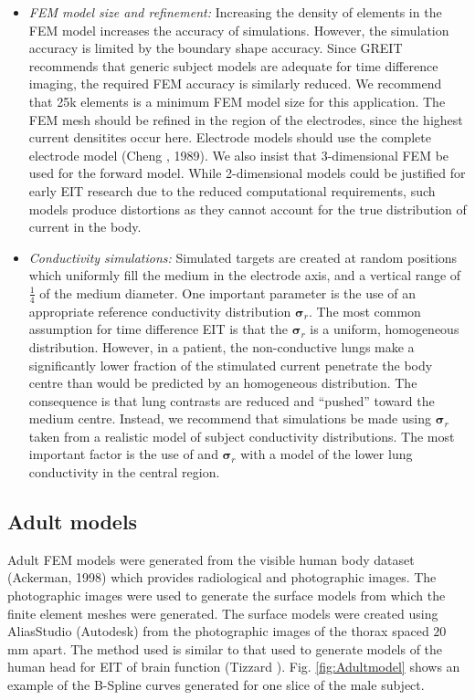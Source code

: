 \documentclass[12pt]{iopart}
\newcommand{\sG}{\mbox{${\boldsymbol \sigma}$}}
\begin{document}
\begin{itemize}
\item 
{\em FEM model size and refinement:}
Increasing the density of elements in the FEM
model increases the accuracy of simulations. However,
the simulation accuracy is limited by the boundary
shape accuracy. Since GREIT recommends that 
generic subject models are adequate for time difference
imaging, the required FEM accuracy is similarly reduced.
We recommend that 25k elements is a minimum FEM model
size for this application.
The FEM mesh should be refined in the region of
the electrodes, since the highest current densitites
occur here. Electrode models should use the
complete electrode model (Cheng \etal, 1989).
We also insist that 3-dimensional FEM be used for the
forward model. While 2-dimensional models could be
justified for early EIT research due to the reduced
computational requirements, such models produce
distortions as they cannot account for the true
distribution of current in the body.

\item
{\em Conductivity simulations:}
Simulated targets are created at random positions
which uniformly fill the medium in the electrode axis, and
a vertical range of $\frac{1}{4}$ of the medium
diameter.  One important parameter is the use of
an appropriate reference conductivity distribution
$\sG_r$. The most common assumption for time 
difference EIT is that the $\sG_r$ is a uniform,
homogeneous distribution. However, in a patient,
the non-conductive lungs make a significantly
lower fraction of the stimulated current penetrate
the body centre than would be predicted by an
homogeneous distribution. The consequence is that
lung contrasts are reduced and ``pushed'' toward
the medium centre. Instead, we recommend that 
simulations be made using $\sG_r$ taken from a
realistic model of subject conductivity distributions.
The most important factor is the use of and $\sG_r$
with a model of the lower lung conductivity in 
the central region.

\end{itemize}



\subsection{Adult models}

Adult FEM models were generated from the visible human body dataset
(Ackerman, 1998) which provides radiological and photographic
images.  The photographic images were used to generate the surface models
from which the finite element meshes were generated.  The surface models
were created using AliasStudio (Autodesk) from the
photographic images of the thorax spaced $20~$mm apart. The method used
is similar to that used to generate models of the human head for EIT of
brain function (Tizzard ). 
Fig. \ref{fig:Adultmodel} shows an example of the
B-Spline curves generated for one slice of the male subject.
\end{document}
